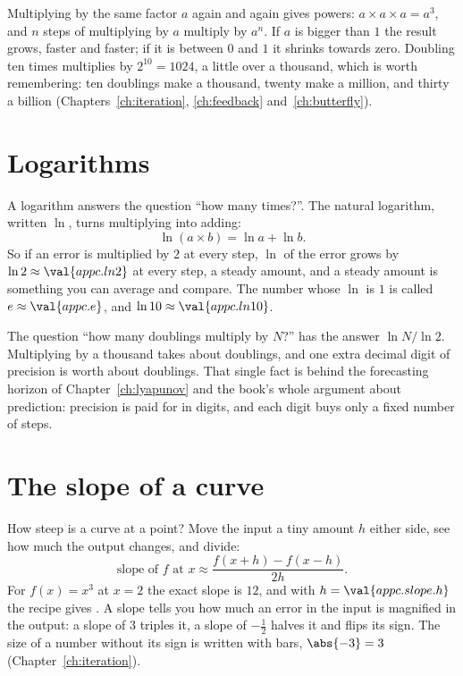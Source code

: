 \noindent
Multiplying by the same factor $a$ again and again gives powers:
$a \times a \times a = a^{3}$, and $n$ steps of multiplying by $a$ multiply by
$a^{n}$. If $a$ is bigger than $1$ the result grows, faster and faster; if it
is between $0$ and $1$ it shrinks towards zero. Doubling ten times multiplies
by $2^{10} = 1024$, a little over a thousand, which is worth remembering: ten
doublings make a thousand, twenty make a million, and thirty a billion
(Chapters~\ref{ch:iteration}, \ref{ch:feedback} and~\ref{ch:butterfly}).

\section{Logarithms}
\label{sec:appc-logs}

\noindent
A logarithm answers the question \enquote{how many times?}. The natural
logarithm, written $\ln$, turns multiplying into adding:
\[ \ln(a \times b) = \ln a + \ln b . \]
So if an error is multiplied by $2$ at every step, $\ln$ of the error grows
by $\ln 2 \approx \val{appc.ln2}$ at every step, a steady amount, and a
steady amount is something you can average and compare. The number whose
$\ln$ is $1$ is called $e \approx \val{appc.e}$, and $\ln 10 \approx
\val{appc.ln10}$.

The question \enquote{how many doublings multiply by $N$?} has the answer
$\ln N / \ln 2$. Multiplying by a thousand takes about 
doublings, and one extra decimal digit of precision is worth about
 doublings. That single fact is behind the
forecasting horizon of Chapter~\ref{ch:lyapunov} and the book's whole
argument about prediction: precision is paid for in digits, and each digit
buys only a fixed number of steps.

\section{The slope of a curve}
\label{sec:appc-slope}

\noindent
How steep is a curve at a point? Move the input a tiny amount $h$ either
side, see how much the output changes, and divide:
\[ \text{slope of } f \text{ at } x \approx \frac{f(x+h) - f(x-h)}{2h} . \]
For $f(x) = x^{3}$ at $x = 2$ the exact slope is $12$, and with
$h = \val{appc.slope.h}$ the recipe gives . A slope
tells you how much an error in the input is magnified in the output: a slope
of $3$ triples it, a slope of $-\tfrac{1}{2}$ halves it and flips its sign.
The size of a number without its sign is written with bars, $\abs{-3} = 3$
(Chapter~\ref{ch:iteration}).

